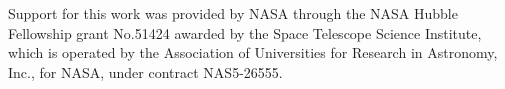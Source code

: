 \documentclass[linenumbers,twocolumn]{aastex62}
\begin{document}
\begin{acknowledgements}

 Support for this work was provided by NASA through the NASA Hubble Fellowship grant No.51424 awarded by the Space Telescope Science Institute, which is operated by the Association of Universities for Research in Astronomy, Inc., for NASA, under contract NAS5-26555.


\end{acknowledgements}






\end{document}
